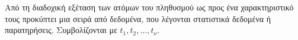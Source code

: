 Από τη διαδοχική εξέταση των ατόμων του πληθυσμού ως προς ένα χαρακτηριστικό τους προκύπτει μια σειρά από δεδομένα, που λέγονται στατιστικά δεδομένα ή παρατηρήσεις. Συμβολίζονται με $ t_1,t_2,\ldots,t_{\nu} $.
